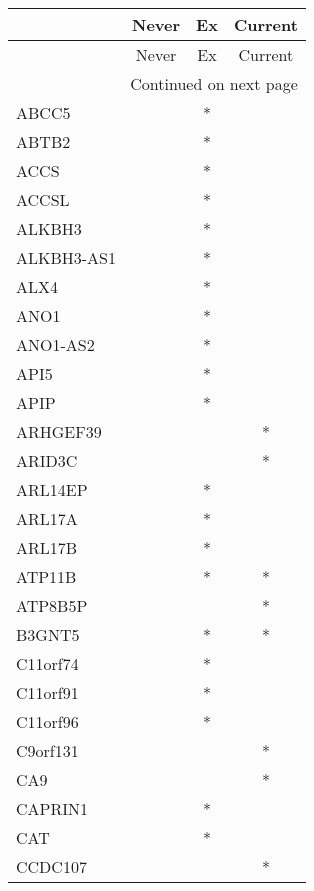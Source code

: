 \begin{longtable}{lccc}
\toprule
{} & Never & Ex & Current \\
\midrule
\endfirsthead

\toprule
{} & Never & Ex & Current \\
\midrule
\endhead
\midrule
\multicolumn{4}{r}{{Continued on next page}} \\
\midrule
\endfoot

\bottomrule
\endlastfoot
ABCC5         &       &  * &         \\
ABTB2         &       &  * &         \\
ACCS          &       &  * &         \\
ACCSL         &       &  * &         \\
ALKBH3        &       &  * &         \\
ALKBH3-AS1    &       &  * &         \\
ALX4          &       &  * &         \\
ANO1          &       &  * &         \\
ANO1-AS2      &       &  * &         \\
API5          &       &  * &         \\
APIP          &       &  * &         \\
ARHGEF39      &       &    &       * \\
ARID3C        &       &    &       * \\
ARL14EP       &       &  * &         \\
ARL17A        &       &  * &         \\
ARL17B        &       &  * &         \\
ATP11B        &       &  * &       * \\
ATP8B5P       &       &    &       * \\
B3GNT5        &       &  * &       * \\
C11orf74      &       &  * &         \\
C11orf91      &       &  * &         \\
C11orf96      &       &  * &         \\
C9orf131      &       &    &       * \\
CA9           &       &    &       * \\
CAPRIN1       &       &  * &         \\
CAT           &       &  * &         \\
CCDC107       &       &    &       * \\

\end{longtable}
